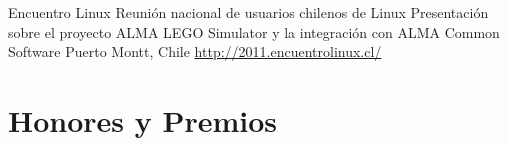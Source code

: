 \documentclass[11pt,a4paper]{moderncv}
\begin{document}
        {Encuentro Linux}
        {Reunión nacional de usuarios chilenos de Linux}
        {Presentación sobre el proyecto ALMA LEGO Simulator y la integración con ALMA Common Software}
        {Puerto Montt, Chile}
        {\url{http://2011.encuentrolinux.cl/}}

\section{Honores y Premios}

\end{document}
